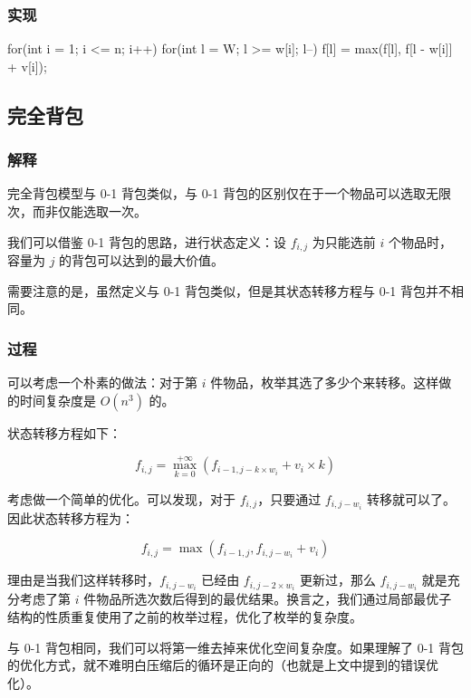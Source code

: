 \subsubsection{实现}\label{ux5b9eux73b0}


\begin{codeline}
for(int i = 1; i <= n; i++) {
    for(int l = W; l >= w[i]; l--) {
        f[l] = max(f[l], f[l - w[i]] + v[i]);
    }
}
\end{codeline}


\subsection{完全背包}\label{ux5b8cux5168ux80ccux5305}

\subsubsection{解释}\label{ux89e3ux91ca-1}

完全背包模型与 0-1 背包类似，与 0-1 背包的区别仅在于一个物品可以选取无限次，而非仅能选取一次。

我们可以借鉴 0-1 背包的思路，进行状态定义：设 \(f_{i,j}\) 为只能选前 \(i\) 个物品时，容量为 \(j\) 的背包可以达到的最大价值。

需要注意的是，虽然定义与 0-1 背包类似，但是其状态转移方程与 0-1 背包并不相同。

\subsubsection{过程}\label{ux8fc7ux7a0b}

可以考虑一个朴素的做法：对于第 \(i\) 件物品，枚举其选了多少个来转移。这样做的时间复杂度是 \(O(n^3)\) 的。

状态转移方程如下：

\[
f_{i,j}=\max_{k=0}^{+\infty}(f_{i-1,j-k\times w_i}+v_i\times k)
\]

考虑做一个简单的优化。可以发现，对于 \(f_{i,j}\)，只要通过 \(f_{i,j-w_i}\) 转移就可以了。因此状态转移方程为：

\[
f_{i,j}=\max(f_{i-1,j},f_{i,j-w_i}+v_i)
\]

理由是当我们这样转移时，\(f_{i,j-w_i}\) 已经由 \(f_{i,j-2\times w_i}\) 更新过，那么 \(f_{i,j-w_i}\) 就是充分考虑了第 \(i\) 件物品所选次数后得到的最优结果。换言之，我们通过局部最优子结构的性质重复使用了之前的枚举过程，优化了枚举的复杂度。

与 0-1 背包相同，我们可以将第一维去掉来优化空间复杂度。如果理解了 0-1 背包的优化方式，就不难明白压缩后的循环是正向的（也就是上文中提到的错误优化）。

